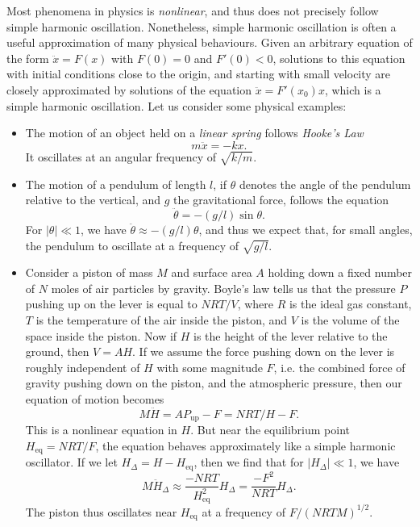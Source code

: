 Most phenomena in physics is \emph{nonlinear}, and thus does not precisely follow simple harmonic oscillation. Nonetheless, simple harmonic oscillation is often a useful approximation of many physical behaviours. Given an arbitrary equation of the form $\ddot{x} = F(x)$ with $F(0) = 0$ and $F'(0) < 0$, solutions to this equation with initial conditions close to the origin, and starting with small velocity are closely approximated by solutions of the equation $\ddot{x} = F'(x_0) x$, which is a simple harmonic oscillation. Let us consider some physical examples:
%
\begin{itemize}
    \item The motion of an object held on a \emph{linear spring} follows \emph{Hooke's Law}
    \[ m \ddot{x} = -k x. \]
    It oscillates at an angular frequency of $\sqrt{k/m}$.

    \item The motion of a pendulum of length $l$, if $\theta$ denotes the angle of the pendulum relative to the vertical, and $g$ the gravitational force, follows the equation
    \[ \ddot{\theta} = - (g/l) \sin \theta. \]
    For $|\theta| \ll 1$, we have $\ddot{\theta} \approx - (g/l) \theta$, and thus we expect that, for small angles, the pendulum to oscillate at a frequency of $\sqrt{g/l}$.

    \item Consider a piston of mass $M$ and surface area $A$ holding down a fixed number of $N$ moles of air particles by gravity. Boyle's law tells us that the pressure $P$ pushing up on the lever is equal to $NRT/V$, where $R$ is the ideal gas constant, $T$ is the temperature of the air inside the piston, and $V$ is the volume of the space inside the piston. Now if $H$ is the height of the lever relative to the ground, then $V = AH$. If we assume the force pushing down on the lever is roughly independent of $H$ with some magnitude $F$, i.e. the combined force of gravity pushing down on the piston, and the atmospheric pressure, then our equation of motion becomes
    \[ M \ddot{H} = A P_{\text{up}} - F = NRT/H - F.  \]
    This is a nonlinear equation in $H$. But near the equilibrium point $H_{\text{eq}} = NRT / F$, the equation behaves approximately like a simple harmonic oscillator. If we let $H_\Delta = H - H_{\text{eq}}$, then we find that for $|H_\Delta| \ll 1$, we have
    \[ M \ddot{H}_\Delta \approx \frac{-NRT}{H_{\text{eq}}^2} H_\Delta = \frac{-F^2}{NRT} H_\Delta. \]
    The piston thus oscillates near $H_{\text{eq}}$ at a frequency of $F / (NRTM)^{1/2}$.
\end{itemize}
